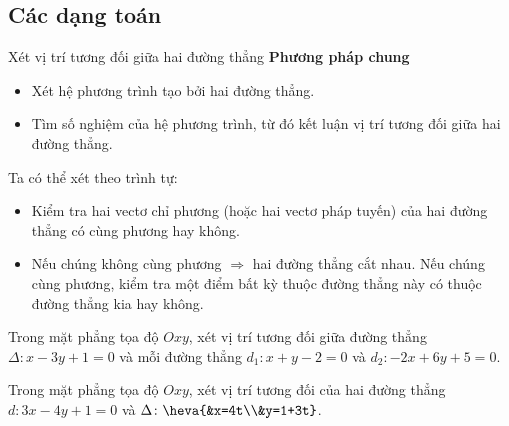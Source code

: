 \subsection{Các dạng toán}
	\begin{dang}{Xét vị trí tương đối giữa hai đường thẳng}
		\textbf{Phương pháp chung}
		\begin{itemize}
			\item [$\bullet$] Xét hệ phương trình tạo bởi hai đường thẳng.
			\item [$\bullet$] Tìm số nghiệm của hệ phương trình, từ đó kết luận vị trí tương đối giữa hai đường thẳng.
		\end{itemize}
	\begin{note}
		Ta có thể xét theo trình tự: \begin{itemize}
			\item Kiểm tra hai vectơ chỉ phương (hoặc hai vectơ pháp tuyến) của hai đường thẳng có cùng phương hay không.
			\item Nếu chúng không cùng phương $\Rightarrow $ hai đường thẳng cắt nhau. Nếu chúng cùng phương, kiểm tra một điểm bất kỳ thuộc đường thẳng này có thuộc đường thẳng kia hay không.
		\end{itemize}
	\end{note}
	\end{dang}
	\viduminhhoa
	\setcounter{vd}{0}
	\begin{vd}%
		Trong mặt phẳng tọa độ $Oxy$, xét vị trí tương đối giữa đường thẳng $\Delta \colon x-3y+1=0$ và mỗi đường thẳng $d_1 \colon x+y-2=0$ và $d_2 \colon -2x+6y+5=0$.
	\end{vd}
	\begin{vd}%
		Trong mặt phẳng tọa độ $Oxy$, xét vị trí tương đối của hai đường thẳng $d \colon 3x-4y+1=0$ và $\Delta \colon \heva{&x=4t\\&y=1+3t}$.
	\end{vd}
